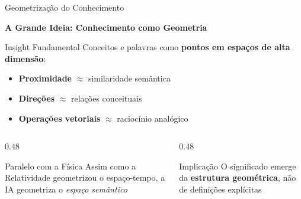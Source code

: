 \documentclass[aspectratio=169,12pt]{beamer}
\begin{document}
\begin{frame}{Geometrização do Conhecimento}
    \begin{center}
        \large\textbf{A Grande Ideia: Conhecimento como Geometria}
    \end{center}
    \vspace{0.2cm}
    \begin{block}{Insight Fundamental}
        Conceitos e palavras como \textbf{pontos em espaços de alta dimensão}:
        \begin{itemize}
            \item \textbf{Proximidade} $\approx$ similaridade semântica
            \item \textbf{Direções} $\approx$ relações conceituais
            \item \textbf{Operações vetoriais} $\approx$ raciocínio analógico
        \end{itemize}
    \end{block}
    \begin{columns}[T]
        \begin{column}{0.48\textwidth}
            \begin{alertblock}{Paralelo com a Física}
                Assim como a Relatividade geometrizou o espaço-tempo, a IA geometriza o \textit{espaço semântico}
            \end{alertblock}
        \end{column}
        \begin{column}{0.48\textwidth}
            \begin{block}{Implicação}
                O significado emerge da \textbf{estrutura geométrica}, não de definições explícitas
            \end{block}
        \end{column}
    \end{columns}
\end{frame}
\end{document}
